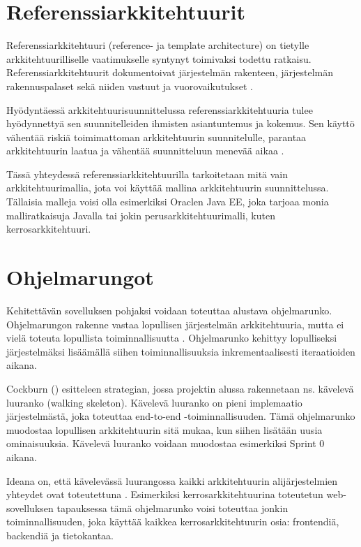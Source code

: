 \section{Referenssiarkkitehtuurit}
Referenssiarkkitehtuuri (reference- ja template architecture) on tietylle arkkitehtuurilliselle vaatimukselle syntynyt toimivaksi todettu ratkaisu. Referenssiarkkitehtuurit dokumentoivat järjestelmän rakenteen, järjestelmän rakennuspalaset sekä niiden vastuut ja vuorovaikutukset \citep{vogel2011software}. 

Hyödyntäessä arkkitehtuurisuunnittelussa referenssiarkkitehtuuria tulee hyödynnettyä sen suunnitelleiden ihmisten asiantuntemus ja kokemus. Sen käyttö vähentää riskiä toimimattoman arkkitehtuurin suunnitelulle, parantaa arkkitehtuurin laatua ja vähentää suunnitteluun menevää aikaa \citep{vogel2011software}.

Tässä yhteydessä referenssiarkkitehtuurilla tarkoitetaan mitä vain arkkitehtuurimallia, jota voi käyttää mallina arkkitehtuurin suunnittelussa. Tällaisia malleja voisi olla esimerkiksi Oraclen Java EE, joka tarjoaa monia malliratkaisuja Javalla tai jokin perusarkkitehtuurimalli, kuten kerrosarkkitehtuuri.

\section{Ohjelmarungot}
Kehitettävän sovelluksen pohjaksi voidaan toteuttaa alustava ohjelmarunko. Ohjelmarungon rakenne vastaa lopullisen järjestelmän arkkitehtuuria, mutta ei vielä toteuta lopullista toiminnallisuutta \citep{vogel2011software}. Ohjelmarunko kehittyy lopulliseksi järjestelmäksi lisäämällä siihen toiminnallisuuksia inkrementaalisesti iteraatioiden aikana.

Cockburn (\citeyear{cockburn2004crystal}) esitteleen strategian, jossa projektin alussa rakennetaan ns. kävelevä luuranko (walking skeleton). Kävelevä luuranko on pieni implemaatio järjestelmästä, joka toteuttaa end-to-end -toiminnallisuuden. Tämä ohjelmarunko muodostaa lopullisen arkkitehtuurin sitä mukaa, kun siihen lisätään uusia ominaisuuksia. Kävelevä luuranko voidaan muodostaa esimerkiksi Sprint 0 aikana.

Ideana on, että kävelevässä luurangossa kaikki arkkitehtuurin alijärjestelmien yhteydet ovat toteutettuna \citep{cockburn2004crystal}.
Esimerkiksi kerrosarkkitehtuurina toteutetun web-sovelluksen tapauksessa tämä ohjelmarunko voisi toteuttaa jonkin toiminnallisuuden, joka käyttää kaikkea kerrosarkkitehtuurin osia: frontendiä, backendiä ja tietokantaa.


